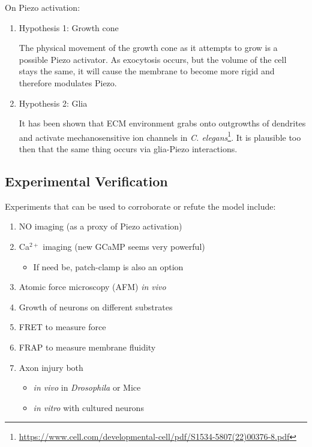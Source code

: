 \documentclass[12pt]{amsart}
\begin{document}
\bigskip



On Piezo activation: 
\begin{enumerate}
    \item Hypothesis 1: Growth cone

   The physical movement of the growth cone as it attempts to grow is a possible Piezo activator. As exocytosis occurs, but the volume of the cell stays the same, it will cause the membrane to become more rigid and therefore modulates Piezo.  
    
    \item Hypothesis 2: Glia

    It has been shown that ECM environment grabs onto outgrowths of dendrites and activate mechanosensitive ion channels in \textit{C. elegans}\footnote{\url{https://www.cell.com/developmental-cell/pdf/S1534-5807(22)00376-8.pdf}}. It is plausible too then that the same thing occurs via glia-Piezo interactions. 
\end{enumerate}


\subsection{Experimental Verification} Experiments that can be used to corroborate or refute the model include: 

 \begin{enumerate}
 \item NO imaging (as a proxy of Piezo activation)
     \item Ca$^{2+}$ imaging (new GCaMP seems very powerful)
     \begin{itemize}
         \item If need be, patch-clamp is also an option
     \end{itemize}
     \item Atomic force microscopy (AFM) \textit{in vivo}
     \item Growth of neurons on different substrates
     \item FRET to measure force
     \item FRAP to measure membrane fluidity
     \item Axon injury both 
     \begin{itemize}
         \item \textit{in vivo} in \textit{Drosophila} or Mice
         \item \textit{in vitro} with cultured neurons
     \end{itemize}
 \end{enumerate}
\end{document}
